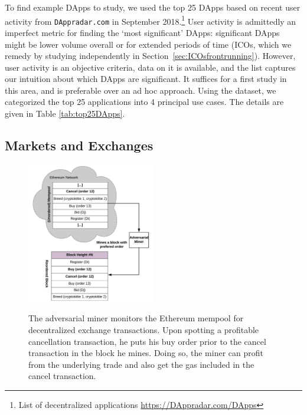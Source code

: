 To find example DApps to study, we used the top 25 DApps based on recent user activity from \texttt{DAppradar.com} in September 2018.\footnote{List of decentralized applications \url{https://DAppradar.com/DApps}} User activity is admittedly an imperfect metric for finding the `most significant' DApps: significant DApps might be lower volume overall or for extended periods of time (\eg ICOs, which we remedy by studying independently in Section~\ref{sec:ICOsfrontrunning}). However, user activity is an objective criteria, data on it is available, and the list captures our intuition about which DApps are significant. It suffices for a first study in this area, and is preferable over an ad hoc approach. Using the dataset, we categorized the top 25 applications into 4 principal use cases. The details are given in Table \ref{tab:top25DApps}.


\subsection{Markets and Exchanges} \label{sec:frontrunningExchanges}

\begin{figure}[h]
\centering

{\caption[Miner Front-running flow]{The adversarial miner monitors the Ethereum mempool for decentralized exchange transactions. Upon spotting a profitable cancellation transaction, he puts his buy order prior to the cancel transaction in the block he mines. Doing so, the miner can profit from the underlying trade and also get the gas included in the cancel transaction.}\label{fig:MinerFrontrunning}}
{\includegraphics[width=0.5\textwidth]{figures/Miner_reorder_frontrun.png}}
\end{figure}

